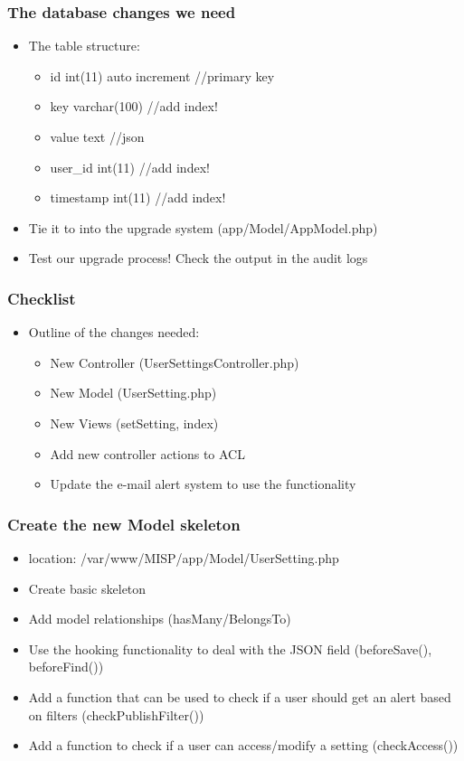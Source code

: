 \begin{frame}
  \frametitle{The database changes we need}
  \begin{itemize}
    \item The table structure:
    \begin{itemize}
      \item id int(11) auto increment   //primary key
      \item key varchar(100)   //add index!
      \item value text   //json
      \item user\_id int(11) //add index!
      \item timestamp int(11) //add index!
    \end{itemize}
    \item Tie it to into the upgrade system (app/Model/AppModel.php)
    \item Test our upgrade process! Check the output in the audit logs
  \end{itemize}
\end{frame}

\begin{frame}
\frametitle{Checklist}
\begin{itemize}
  \item Outline of the changes needed:
    \begin{itemize}
    \item New Controller (UserSettingsController.php)
    \item New Model (UserSetting.php)
    \item New Views (setSetting, index)
    \item Add new controller actions to ACL
    \item Update the e-mail alert system to use the functionality
    \end{itemize}
  \end{itemize}
\end{frame}

\begin{frame}
\frametitle{Create the new Model skeleton}
  \begin{itemize}
    \item location: /var/www/MISP/app/Model/UserSetting.php
    \item Create basic skeleton
    \item Add model relationships (hasMany/BelongsTo)
    \item Use the hooking functionality to deal with the JSON field (beforeSave(), beforeFind())
    \item Add a function that can be used to check if a user should get an alert based on filters (checkPublishFilter())
    \item Add a function to check if a user can access/modify a setting (checkAccess())
  \end{itemize}
\end{frame}

